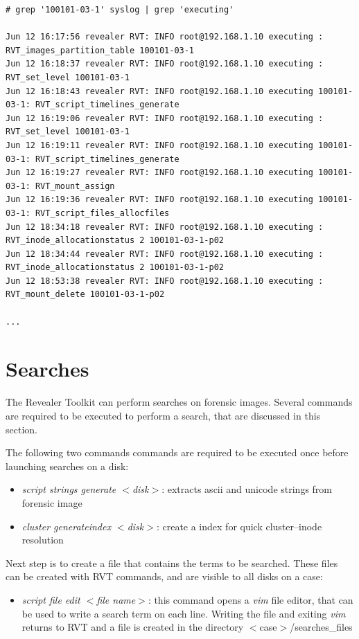 \documentclass[a4paper,11pt,oneside]{report}
\begin{document}
{ \footnotesize
\begin{verbatim}
# grep '100101-03-1' syslog | grep 'executing'

Jun 12 16:17:56 revealer RVT: INFO root@192.168.1.10 executing : RVT_images_partition_table 100101-03-1 
Jun 12 16:18:37 revealer RVT: INFO root@192.168.1.10 executing : RVT_set_level 100101-03-1 
Jun 12 16:18:43 revealer RVT: INFO root@192.168.1.10 executing 100101-03-1: RVT_script_timelines_generate  
Jun 12 16:19:06 revealer RVT: INFO root@192.168.1.10 executing : RVT_set_level 100101-03-1 
Jun 12 16:19:11 revealer RVT: INFO root@192.168.1.10 executing 100101-03-1: RVT_script_timelines_generate  
Jun 12 16:19:27 revealer RVT: INFO root@192.168.1.10 executing 100101-03-1: RVT_mount_assign  
Jun 12 16:19:36 revealer RVT: INFO root@192.168.1.10 executing 100101-03-1: RVT_script_files_allocfiles  
Jun 12 18:34:18 revealer RVT: INFO root@192.168.1.10 executing : RVT_inode_allocationstatus 2 100101-03-1-p02 
Jun 12 18:34:44 revealer RVT: INFO root@192.168.1.10 executing : RVT_inode_allocationstatus 2 100101-03-1-p02 
Jun 12 18:53:38 revealer RVT: INFO root@192.168.1.10 executing : RVT_mount_delete 100101-03-1-p02

...
\end{verbatim}
}



\section{Searches} \label{anx:searches}

The Revealer Toolkit can perform searches on forensic images. Several commands are required to be executed to perform a search, that are discussed in this section.

The following two commands commands are required to be executed once before launching searches on a disk:

\begin{itemize}
\item \emph{script strings generate $<$disk$>$}:  extracts ascii and unicode strings from forensic image 
\item \emph{cluster generateindex $<$disk$>$}:  create a index for quick cluster--inode resolution
\end{itemize}

Next step is to create a file that contains the terms to be searched. These files can be created with RVT commands, and are visible to all disks on a case:

\begin{itemize}
\item \emph{script file edit $<$file name$>$}: this command opens a \emph{vim} file editor, that can be used to write a search term on each line. Writing the file and exiting \emph{vim} returns to RVT and a file is created in the directory $<$case$>$/searches\_files 
\end{itemize}
\end{document}
